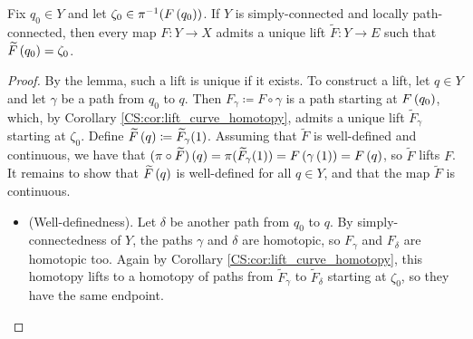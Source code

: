 \documentclass[../Moduli_Spaces_of_Riemann_Surfaces.tex]{subfiles}
\begin{document}
    \begin{proposition}
        Fix $q_0\in Y$ and let $\zeta_0\in\pi^{-1}\!\left(F\left(q_0\right)\right)$. If $Y$ is simply-connected and locally path-connected, then every map $F:Y\to X$ admits a unique lift $\widetilde{F}:Y\to E$ such that $\widetilde{F}\left(q_0\right)=\zeta_0$.
    \end{proposition}
    \begin{proof}
        By the lemma, such a lift is unique if it exists. To construct a lift, let $q\in Y$ and let $\gamma$ be a path from $q_0$ to $q$. Then $F_\gamma\coloneqq F\circ\gamma$ is a path starting at $F\left(q_0\right)$, which, by Corollary \ref{CS:cor:lift_curve_homotopy}, admits a unique lift $\widetilde{F}_\gamma$ starting at $\zeta_0$. Define $\widetilde{F}\left(q\right)\coloneqq\widetilde{F}_\gamma\!\left(1\right)$. Assuming that $\widetilde{F}$ is well-defined and continuous, we have that $(\pi\circ\widetilde{F})\left(q\right)=\pi(\widetilde{F}_\gamma\!\left(1\right))=F\left(\gamma\left(1\right)\right)=F\left(q\right)$, so $\widetilde{F}$ lifts $F$. It remains to show that $\widetilde{F}\left(q\right)$ is well-defined for all $q\in Y$, and that the map $\widetilde{F}$ is continuous.
        \begin{itemize}
            \item (Well-definedness). Let $\delta$ be another path from $q_0$ to $q$. By simply-connectedness of $Y$, the paths $\gamma$ and $\delta$ are homotopic, so $F_\gamma$ and $F_\delta$ are homotopic too. Again by Corollary \ref{CS:cor:lift_curve_homotopy}, this homotopy lifts to a homotopy of paths from $\widetilde{F}_\gamma$ to $\widetilde{F}_\delta$ starting at $\zeta_0$, so they have the same endpoint.
                \vspace{-0.2in}
                \begin{center}
\end{center}
\end{itemize}
\end{proof}
\end{document}
